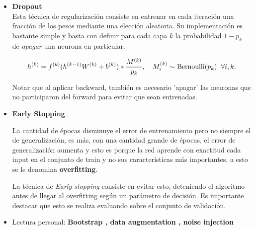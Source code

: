\documentclass[handout, 9pt]{beamer}
\begin{document}
\begin{frame}
\begin{itemize}
  \item \textbf{Dropout} \\ 

  Esta técnica de regularización consiste en entrenar en cada iteración una fracción de los pesos mediante una elección aleatoria. Su implementación es bastante simple y basta con definir para cada capa $k$ la probabilidad $1-p_k$ de \emph{apagar} una neurona en particular. \pause

    \[
    h^{(k)} = f^{(k)}(h^{(k-1)}W^{(k)} + b^{(k)}) *  \frac{M^{(k)}}{p_k}, \quad M^{(k)}_i \sim \text{Bernoulli}(p_k) \hspace{0.2cm} \forall i,k.
    \]

  Notar que al aplicar backward, también es necesario 'apagar' las neuronas que no participaron del forward para evitar que sean entrenadas. \pause

  \item \textbf{Early Stopping} \pause

  La cantidad de épocas disminuye el error de entrenamiento pero no siempre el de generalización, es más, con una cantidad grande de épocas, el error de generalización aumenta y esto es porque la red aprende con exactitud cada input en el conjunto de train y no sus características más importantes, a esto se le denomina \textbf{overfitting}. \\ \pause

  La técnica de \textit{Early stopping} consiste en evitar esto, deteniendo el algoritmo antes de llegar al overfitting según un parámetro de decisión. Es importante destacar que esto se realiza evaluando sobre el conjunto de validación. \pause

  \item Lectura personal: \textbf{Bootstrap , data augmentation , noise injection}


\end{itemize}


\end{frame}

\begin{frame}
  \titlepage
\end{frame}






%
\end{document}
